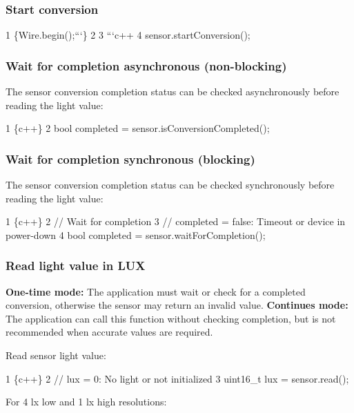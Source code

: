 \subsubsection*{Start conversion}


\begin{DoxyCode}
1 \{Wire.begin();```\}
2 
3 ```c++
4 sensor.startConversion();
\end{DoxyCode}


\subsubsection*{Wait for completion asynchronous (non-\/blocking)}

The sensor conversion completion status can be checked asynchronously before reading the light value\+:


\begin{DoxyCode}
1 \{c++\}
2 bool completed = sensor.isConversionCompleted();
\end{DoxyCode}


\subsubsection*{Wait for completion synchronous (blocking)}

The sensor conversion completion status can be checked synchronously before reading the light value\+:


\begin{DoxyCode}
1 \{c++\}
2 // Wait for completion
3 // completed = false: Timeout or device in power-down
4 bool completed = sensor.waitForCompletion();
\end{DoxyCode}


\subsubsection*{Read light value in L\+UX}

{\bfseries One-\/time mode\+:} The application must wait or check for a completed conversion, otherwise the sensor may return an invalid value. {\bfseries Continues mode\+:} The application can call this function without checking completion, but is not recommended when accurate values are required.

Read sensor light value\+:


\begin{DoxyCode}
1 \{c++\}
2 // lux = 0: No light or not initialized
3 uint16\_t lux = sensor.read();
\end{DoxyCode}
 For 4 lx low and 1 lx high resolutions\+:



